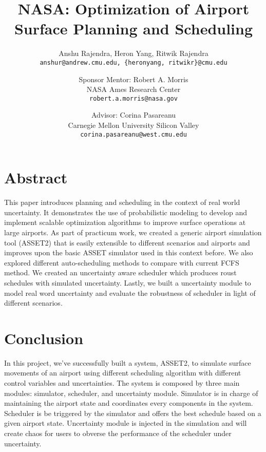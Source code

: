 \documentclass{article}
\begin{document}
\title{NASA: Optimization of Airport Surface Planning and Scheduling}
\author{Anshu Rajendra, Heron Yang, Ritwik Rajendra\\
	\texttt{anshur@andrew.cmu.edu, \{heronyang, ritwikr\}@cmu.edu}\\
	\and
	Sponsor Mentor: Robert A. Morris\\
	NASA Ames Research Center\\
	\texttt{robert.a.morris@nasa.gov}\\
	\and
	Advisor: Corina Pasareanu\\
    Carnegie Mellon University Silicon Valley\\
	\texttt{corina.pasareanu@west.cmu.edu}
}

\maketitle

\section{Abstract}
    This paper introduces planning and scheduling in the context of real world uncertainty. It demonstrates the use of probabilistic modeling to develop and implement scalable optimization algorithms to improve surface operations at large airports. As part of practicum work, we created a generic airport simulation tool (ASSET2) that is easily extensible to different scenarios and airports and improves upon the basic ASSET simulator used in this context before. We also explored different auto-scheduling methods to compare with current FCFS method. We created an uncertainty aware scheduler which produces roust schedules with simulated uncertainty. Lastly, we built a uncertainty module to model real word uncertainty and evaluate the robustness of scheduler in light of different scenarios. 

\section{Conclusion}

In this project, we've successfully built a system, ASSET2, to simulate surface movements of an airport using different scheduling algorithm with different control variables and uncertainties. The system is composed by three main modules: simulator, scheduler, and uncertainty module. Simulator is in charge of maintaining the airport state and coordinates every components in the system. Scheduler is be triggered by the simulator and offers the best schedule based on a given airport state. Uncertainty module is injected in the simulation and will create chaos for users to obverse the performance of the scheduler under uncertainty.
\end{document}
